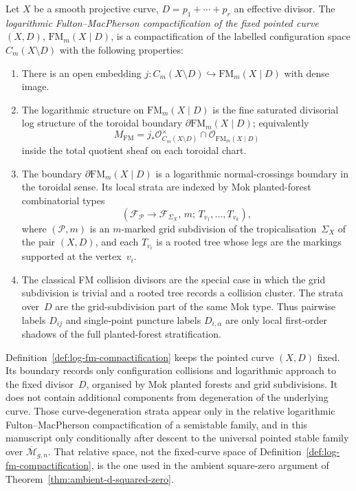 \begin{definition}
\label{def:log-fm-compactification}
\ClaimStatusProvedElsewhere
{}
Let $X$ be a smooth projective curve, $D = p_1 + \cdots + p_r$ an
effective divisor. The \emph{logarithmic Fulton--MacPherson
compactification of the fixed pointed curve $(X,D)$},
$\mathrm{FM}_m(X \mathbin{|} D)$, is a compactification of the
labelled configuration space $C_m(X \setminus D)$ with the following
properties:
\begin{enumerate}
\item There is an open embedding
 $j\colon C_m(X \setminus D) \hookrightarrow
 \mathrm{FM}_m(X \mathbin{|} D)$
 with dense image.
\item The logarithmic structure on
 $\mathrm{FM}_m(X \mathbin{|} D)$ is the fine saturated divisorial
 log structure of the toroidal boundary
 $\partial\mathrm{FM}_m(X\mathbin{|}D)$; equivalently
 \[
 M_{\mathrm{FM}}=
 j_*\mathcal O^\times_{C_m(X\setminus D)}
 \cap \mathcal O_{\mathrm{FM}_m(X\mathbin{|}D)}
 \]
 inside the total quotient sheaf on each toroidal chart.
\item The boundary
 $\partial\mathrm{FM}_m(X \mathbin{|} D)$ is a logarithmic
 normal-crossings boundary in the toroidal sense. Its local strata
 are indexed by Mok planted-forest combinatorial types
 \[
 (\mathcal F_{\mathcal P}\to\mathcal F_{\Sigma_X},\,m;\,
 T_{v_1},\ldots,T_{v_k}),
 \]
 where $(\mathcal P,m)$ is an $m$-marked grid subdivision of the
 tropicalisation~$\Sigma_X$ of the pair $(X,D)$, and each
 $T_{v_i}$ is a rooted tree whose legs are the markings supported
 at the vertex~$v_i$.
\item The classical FM collision divisors are the special case in
 which the grid subdivision is trivial and a rooted tree records a
 collision cluster. The strata over~$D$ are the grid-subdivision
 part of the same Mok type. Thus pairwise labels $D_{ij}$ and
 single-point puncture labels $D_{i,\alpha}$ are only local
 first-order shadows of the full planted-forest stratification.
\end{enumerate}
\end{definition}

\begin{remark}
\label{rem:log-fm-fixed-vs-relative}
Definition~\ref{def:log-fm-compactification} keeps the pointed
curve $(X,D)$ fixed. Its boundary records only configuration
collisions and logarithmic approach to the fixed divisor~$D$,
organised by Mok planted forests and grid subdivisions. It does
not contain additional components from degeneration of the
underlying curve. Those curve-degeneration strata appear only in
the relative logarithmic Fulton--MacPherson compactification of a
semistable family, and in this manuscript only conditionally after
descent to the universal pointed stable family over
$\overline{\mathcal{M}}_{g,n}$.
That relative space, not the fixed-curve space of
Definition~\ref{def:log-fm-compactification}, is the one used in
the ambient square-zero argument of
Theorem~\ref{thm:ambient-d-squared-zero}.
\end{remark}

